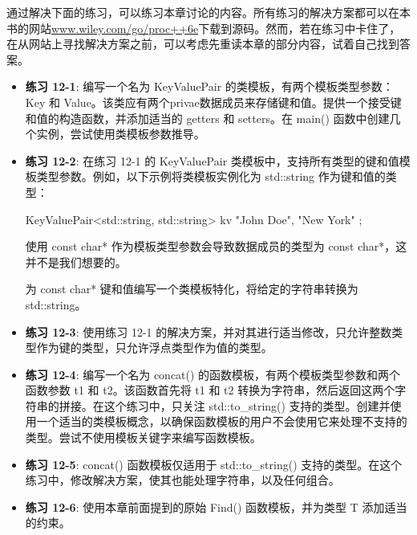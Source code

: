 通过解决下面的练习，可以练习本章讨论的内容。所有练习的解决方案都可以在本书的网站\url{www.wiley.com/go/proc++6e}下载到源码。然而，若在练习中卡住了，在从网站上寻找解决方案之前，可以考虑先重读本章的部分内容，试着自己找到答案。

\begin{itemize}
\item
\textbf{练习 12-1}: 编写一个名为 KeyValuePair 的类模板，有两个模板类型参数：Key 和 Value。该类应有两个privae数据成员来存储键和值。提供一个接受键和值的构造函数，并添加适当的 getters 和 setters。在 main() 函数中创建几个实例，尝试使用类模板参数推导。

\item
\textbf{练习 12-2}: 在练习 12-1 的 KeyValuePair 类模板中，支持所有类型的键和值模板类型参数。例如，以下示例将类模板实例化为 std::string 作为键和值的类型：

\begin{cpp}
KeyValuePair<std::string, std::string> kv { "John Doe", "New York" };
\end{cpp}

使用 const char* 作为模板类型参数会导致数据成员的类型为 const char*，这并不是我们想要的。

为 const char* 键和值编写一个类模板特化，将给定的字符串转换为 std::string。

\item
\textbf{练习 12-3}: 使用练习 12-1 的解决方案，并对其进行适当修改，只允许整数类型作为键的类型，只允许浮点类型作为值的类型。

\item
\textbf{练习 12-4}: 编写一个名为 concat() 的函数模板，有两个模板类型参数和两个函数参数 t1 和 t2。该函数首先将 t1 和 t2 转换为字符串，然后返回这两个字符串的拼接。在这个练习中，只关注 std::to\_string() 支持的类型。创建并使用一个适当的类模板概念，以确保函数模板的用户不会使用它来处理不支持的类型。尝试不使用模板关键字来编写函数模板。

\item
\textbf{练习 12-5}: concat() 函数模板仅适用于 std::to\_string() 支持的类型。在这个练习中，修改解决方案，使其也能处理字符串，以及任何组合。

\item
\textbf{练习 12-6}: 使用本章前面提到的原始 Find() 函数模板，并为类型 T 添加适当的约束。
\end{itemize}